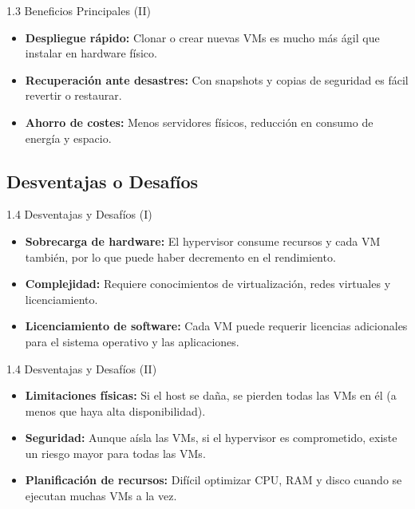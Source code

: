 \documentclass{beamer}
\begin{document}
\begin{frame}{1.3 Beneficios Principales (II)}
	\begin{itemize}
		\item \textbf{Despliegue rápido:} Clonar o crear nuevas VMs es mucho más ágil que instalar en hardware físico.
		\item \textbf{Recuperación ante desastres:} Con snapshots y copias de seguridad es fácil revertir o restaurar.
		\item \textbf{Ahorro de costes:} Menos servidores físicos, reducción en consumo de energía y espacio.
	\end{itemize}
\end{frame}

\subsection{Desventajas o Desafíos}
\begin{frame}{1.4 Desventajas y Desafíos (I)}
	\begin{itemize}
		\item \textbf{Sobrecarga de hardware:} El hypervisor consume recursos y cada VM también, por lo que puede haber decremento en el rendimiento.
		\item \textbf{Complejidad:} Requiere conocimientos de virtualización, redes virtuales y licenciamiento.
		\item \textbf{Licenciamiento de software:} Cada VM puede requerir licencias adicionales para el sistema operativo y las aplicaciones.
	\end{itemize}
\end{frame}

\begin{frame}{1.4 Desventajas y Desafíos (II)}
	\begin{itemize}
		\item \textbf{Limitaciones físicas:} Si el host se daña, se pierden todas las VMs en él (a menos que haya alta disponibilidad).
		\item \textbf{Seguridad:} Aunque aísla las VMs, si el hypervisor es comprometido, existe un riesgo mayor para todas las VMs.
		\item \textbf{Planificación de recursos:} Difícil optimizar CPU, RAM y disco cuando se ejecutan muchas VMs a la vez.
	\end{itemize}
\end{frame}

\end{document}
